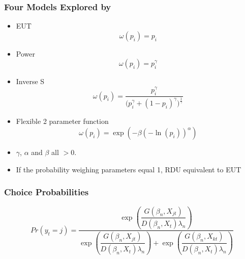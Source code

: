 \documentclass{beamer}
\newcommand\Prob{\ensuremath{\mathit{Pr}}}  %
\begin{document}
\begin{frame}
\frametitle{Four Models Explored by \textcite{Harrison2016}}
\begin{itemize}
	\item EUT
		\begin{equation}
			\label{eq4:pw:eut}
			\omega(p_i) = p_i
		\end{equation}
	\item Power \parencite{Quiggin1982}
		\begin{equation}
			\label{eq4:pw:pow}
			\omega(p_i)=p_i^\gamma
		\end{equation}
	\item Inverse S \parencite{Kahneman1979}
		\begin{equation}
			\label{eq4:pw:inv}
			\omega(p_i) = \frac{p_i^\gamma}{\biggl(p_i^\gamma + {(1-p_i)}^\gamma\biggr)^{ \frac{1}{\gamma} } }
		\end{equation}
	\item Flexible 2 parameter function \parencite{Prelec1998}
		\begin{equation}
			\label{eq4:pw:pre}
			\omega(p_i)=\exp(-\beta(-\ln(p_i))^\alpha)
		\end{equation}

	\item $\gamma$, $\alpha$ and $\beta$ all $> 0$.
	\item If the probability weighing parameters equal 1, RDU equivalent to EUT

\end{itemize}
\end{frame}

\begin{frame}
\frametitle{Choice Probabilities}
\begin{equation}
	\label{eq4:RE.f}
	{\Prob}(y_t=j) =\dfrac{\exp\!\left( \dfrac{ G(\beta_n,X_{jt}) }{ D(\beta_n,X_{t})\lambda_n }  \right)}{  \exp\!\left( \dfrac{ G(\beta_n,X_{jt}) }{ D(\beta_n,X_{t})\lambda_n }  \right) + \exp\!\left( \dfrac{ G(\beta_n,X_{kt}) }{ D(\beta_n,X_{t})\lambda_n }  \right)    }
\end{equation}

\end{frame}
\end{document}
